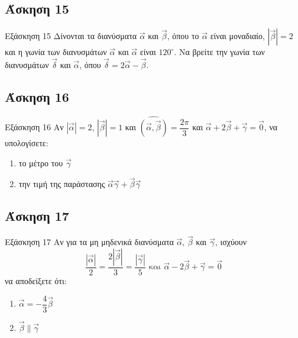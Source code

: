 \documentclass[greek]{beamer}
\begin{document}
\subsection{Άσκηση 15}
\begin{frame}[label=Άσκηση15,t]{Εξάσκηση 15}
      Δίνονται τα διανύσματα $\vec{α}$ και $\vec{β}$, όπου το $\vec{α}$ είναι μοναδιαίο, $|\vec{β}|=2$ και η γωνία των διανυσμάτων $\vec{α}$ και $\vec{α}$ είναι $120^{\circ}$. Να βρείτε την γωνία των διανυσμάτων $\vec{δ}$ και $\vec{α}$, όπου $\vec{δ}=2\vec{α}-\vec{β}$.
\end{frame}

\subsection{Άσκηση 16}
\begin{frame}[label=Άσκηση16,t]{Εξάσκηση 16}
      Αν $|\vec{α}|=2$, $|\vec{β}|=1$ και $\widehat{(\vec{α }, \vec{β })}=\dfrac{2\pi}{3}$ και $\vec{α}+2\vec{β}+\vec{γ}=\vec{0}$, να υπολογίσετε:
      \begin{enumerate}
            \item<1-> το μέτρο του $\vec{γ}$
            \item<2-> την τιμή της παράστασης $\vec{α}\vec{γ}+\vec{β}\vec{γ}$
      \end{enumerate}
\end{frame}

\subsection{Άσκηση 17}
\begin{frame}[label=Άσκηση17,t]{Εξάσκηση 17}
      Αν για τα μη μηδενικά διανύσματα $\vec{α}$, $\vec{β}$ και $\vec{γ}$, ισχύουν
      $$\dfrac{|\vec{α}|}{2}=\dfrac{2|\vec{β}|}{3}=\dfrac{|\vec{γ}|}{5} \text{ και } \vec{α}-2\vec{β}+\vec{γ}=\vec{0}$$
      να αποδείξετε ότι:
      \begin{enumerate}
            \item<1-> $\vec{α}=-\dfrac{4}{3}\vec{β}$
            \item<2-> $\vec{β}\parallel \vec{γ}$
      \end{enumerate}
\end{frame}
\end{document}

